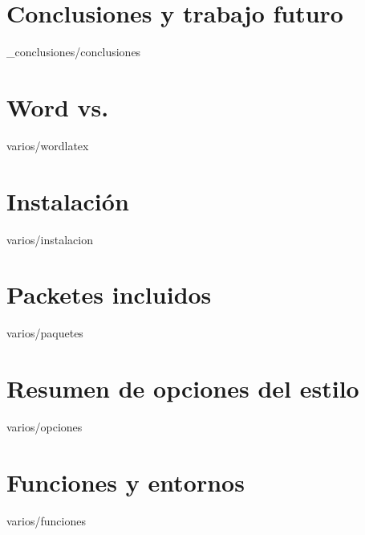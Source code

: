 \documentclass[epsbased,copyright,final,printable,covers,extendedindex,firstnumbered,tfg,gnuplot]{tfgtfmthesisuam}
\begin{document}
\chapter{Conclusiones y trabajo futuro\label{CAP:ELEMINT}}{_conclusiones/conclusiones}

\appendix

\chapter{Word\textsuperscript{\textregistered} vs. \LaTeXe\label{CAP:WORDLATEX}}{varios/wordlatex}
\chapter{Instalación\label{CAP:INSTALACION}}{varios/instalacion}
\chapter{Packetes incluidos\label{CAP:PAQUETES}}{varios/paquetes}
\chapter{Resumen de opciones del estilo\label{CAP:OPCIONES}}{varios/opciones}
\chapter{Funciones y entornos\label{CAP:FUNCENT}}{varios/funciones}
\end{document}
